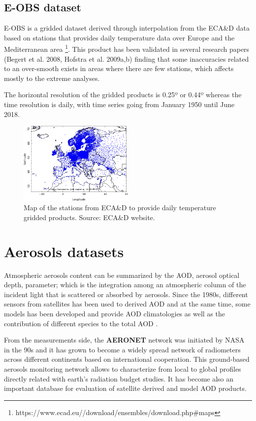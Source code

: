 \subsection{E-OBS dataset}
  
  E-OBS is a gridded dataset derived through interpolation from the ECA\&D data based on stations that provides daily temperature data over Europe and the Mediterranean area \footnote{https://www.ecad.eu//download/ensembles/download.php#maps}. This product has been validated in several research papers (Begert et al. 2008, Hofstra et al. 2009a,b) finding that some inaccuracies related to an over-smooth exists in areas where there are few stations, which affects mostly to the extreme analyses.

The horizontal resolution of the gridded products is 0.25º or 0.44º whereas the time resolution is daily, with time series going from January 1950 until June 2018.  


\begin{figure}
\centering
\includegraphics[width=0.5\textwidth]{figs/all_stations_plot.png}
\caption{Map of the stations from ECA\&D to provide daily temperature gridded products. Source: ECA\&D website.}
\label{fig:ecad}
\end{figure}

\section{Aerosols datasets}

Atmospheric aerosols content can be summarized by the AOD, aerosol optical depth, parameter; which is the integration among an atmospheric column of the incident light that is scattered or absorbed by aerosols. Since the 1980s, different sensors from satellites has been used to derived AOD and at the same time, some models has been developed and provide AOD climatologies as well as the contribution of different species to the total AOD \cite*{Nabat2013}.

From the measurements side, the \textbf{AERONET} network \cite*{Holben1998} was initiated by NASA in the 90s and it has grown to become a widely spread network of radiometers across different continents based on international cooperation. This ground-based aerosols monitoring network allows to characterize from local to global profiles directly related with earth's radiation budget studies. It has become also an important database for evaluation of satellite derived and model AOD products.

